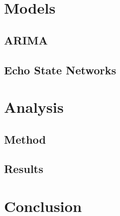 \documentclass{article}
\begin{document}
\section{Models}

\subsection{ARIMA}
\subsection{Echo State Networks}

\section{Analysis}

\subsection{Method}
\subsection{Results}

\section{Conclusion}



\end{document}
